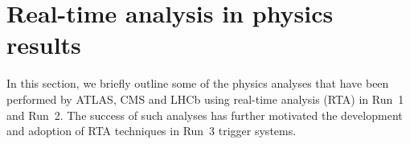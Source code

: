 \section{Real-time analysis in physics results}
\label{sec:RTA_physics}

In this section, we briefly outline some of the physics analyses that have been performed by ATLAS, CMS and LHCb using real-time analysis (RTA) in Run~1 and Run~2. The success of such analyses has further motivated the development and adoption of RTA techniques in Run~3 trigger systems. %

\iffalse

